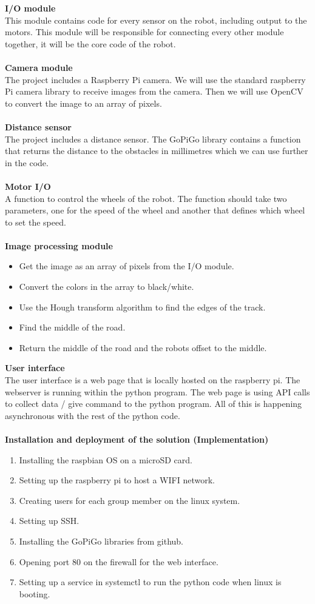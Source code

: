 \documentclass[11pt]{article}
\begin{document}
\textbf{I/O module}
\\
This module contains code for every sensor on the robot, including output to the motors. This module will be responsible for connecting every other module together, it will be the core code of the robot. 
\\\\
\textbf{Camera module}
\\
The project includes a Raspberry Pi camera. We will use the standard raspberry Pi camera library to receive images from the camera. Then we will use OpenCV to convert the image to an array of pixels.
\\\\
\textbf{Distance sensor}
\\ 
The project includes a distance sensor. The GoPiGo library contains a function that returns the distance to the obstacles in millimetres which we can use further in the code. 
\\\\
\textbf{Motor I/O}
\\
A function to control the wheels of the robot. The function should take two parameters, one for the speed of the wheel and another that defines which wheel to set the speed. 
\\\\
\textbf{Image processing module}
\\
\begin{itemize}
    \item Get the image as an array of pixels from the I/O module. 
    \item Convert the colors in the array to black/white.
    \item Use the Hough transform algorithm to find the edges of the track.
    \item Find the middle of the road.
    \item Return the middle of the road and the robots offset to the middle. 
\end{itemize}
\textbf{User interface} 
\\
The user interface is a web page that is locally hosted on the raspberry pi. The webserver is running within the python program. The web page is using API calls to collect data / give command to the python program. All of this is happening asynchronous with the rest of the python code. 
\\\\
\textbf{Installation and deployment of the solution (Implementation)}
\begin{enumerate}
    \item Installing the raspbian OS on a microSD card. 
    \item Setting up the raspberry pi to host a WIFI network. 
    \item Creating users for each group member on the linux system.
    \item Setting up SSH. 
    \item Installing the GoPiGo libraries from github. 
    \item Opening port 80 on the firewall for the web interface. 
    \item Setting up a service in systemctl to run the python code when linux is booting.
\end{enumerate}
\end{document}
